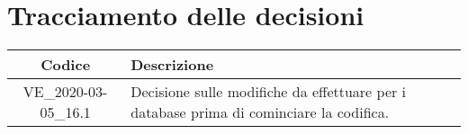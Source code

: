 \section*{Tracciamento delle decisioni}

\begin{center}
	\begin{longtable}{|c|p{12.25cm}|}
	\hline
	\rowcolor{lighter-grayer}
	\textbf{Codice} & \textbf{Descrizione} \\
	\hline
	\endfirsthead
	
	\hline
	VE\_2020-03-05\_16.1 & Decisione sulle modifiche da effettuare per i database prima di cominciare la codifica. \\
	\hline

	\end{longtable}
\end{center}